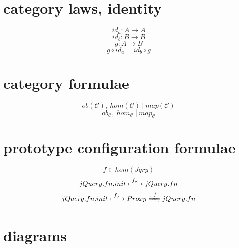 \documentclass[11hpt]{article}
\begin{document}
\section{category laws, identity}
\begin{equation}
id_{a}: A \to A
\end{equation}
\begin{equation}
id_{b}: B \to B
\end{equation}
\begin{equation}
g: A \to B
\end{equation}
\begin{equation}
g \circ id_{a} = id_{b} \circ g
\end{equation}

\section{category formulae}
\begin{equation}
ob(\mathcal{C}),\ hom(\mathcal{C})\ |\ map(\mathcal{C})
\end{equation}
\begin{equation}
ob_{\mathcal{C}},\ hom_{\mathcal{C}}\ |\ map_{\mathcal{C}}
\end{equation}


\section{prototype configuration formulae}

\begin{equation}
 f \in hom(Jqry)
\end{equation}
\begin{equation} \label{eq:jquery-default}
 jQuery.fn.init \xmapsto{\ f_{\sigma}\ } jQuery.fn
\end{equation}
\begin{equation} \label{eq:jquery-with-proxy}
 jQuery.fn.init \xmapsto{\ f_{\sigma}\ } Proxy \xleftrightharpoons{\ f\ } jQuery.fn
\end{equation}

\section{diagrams}
\end{document}
